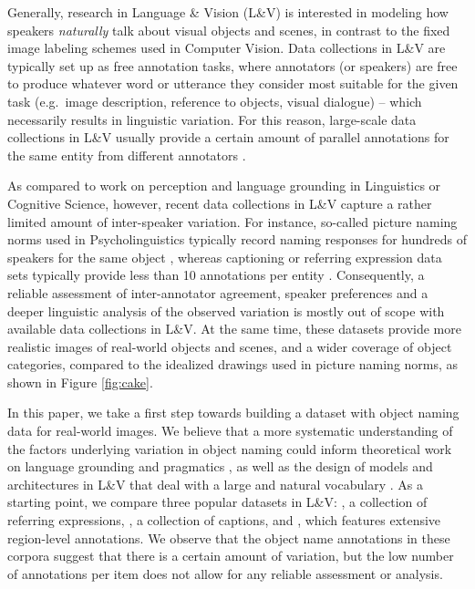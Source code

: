 Generally, research in Language \& Vision (L\&V) is interested in modeling how speakers \textit{naturally} talk about visual objects and scenes, in contrast to the fixed image labeling schemes used in Computer Vision.
Data collections in L\&V are typically set up as free annotation tasks,  where annotators (or speakers) are free to produce whatever word or utterance they consider most suitable for the given task (e.g.\ image description, reference to objects, visual dialogue) -- which necessarily results in linguistic variation.
For this reason, large-scale data collections in L\&V usually provide a certain amount of parallel annotations for the same entity from different annotators \cite{fangetal:2015,devlin:imcaqui,Kazemzadeh2014,mao15,vries2017guesswhat}.

As compared to work on perception and language grounding in Linguistics or Cognitive Science, however, recent data collections in L\&V capture a rather limited amount of inter-speaker variation.
For instance, so-called picture naming norms used in Psycholinguistics typically record naming responses for hundreds of speakers for the same object  \cite{snodgrass,rossion2004revisiting}, whereas captioning or referring expression data sets typically provide less than 10 annotations per entity \cite{devlin:imcaqui,Kazemzadeh2014,mao15}.
Consequently, a reliable assessment of inter-annotator agreement, speaker preferences and a deeper linguistic analysis of the observed variation is mostly out of scope with available data collections in  L\&V.
At the same time, these datasets provide more realistic images of real-world objects and scenes, and a wider coverage of object categories, compared to the idealized drawings used in picture naming norms, as shown in Figure \ref{fig:cake}.

In this paper, we take a first step towards building a dataset with object naming data for real-world images. We believe that a more systematic understanding of the factors underlying variation in object naming could inform theoretical work on language grounding and pragmatics \cite{rohde2012communicating,graf2016animal}, as well as the design of models and architectures in L\&V that deal with a large and natural vocabulary \cite{lazaridou-dinu-baroni:2015:ACL-IJCNLP,Ordonez:2016,zhao2017open}. As a starting point, we compare three popular datasets in L\&V: , a collection of referring expressions, \flickr, a collection of captions, and \vgenome, which features extensive region-level annotations. We observe that the object name annotations in these corpora suggest that there is a certain amount of variation, but the low number of annotations per item does not allow for any reliable assessment or analysis.

